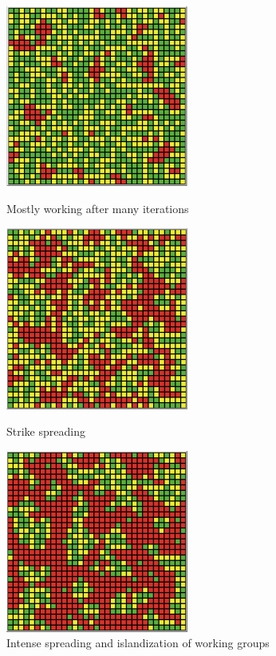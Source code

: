 \documentclass[11pt]{article}
\begin{document}
\begin{figure}[htbp]
	\centering
	\includegraphics[width=6cm, height=6cm]{start}
	\caption{Mostly working after many iterations}
	\centering
	\includegraphics[width=6cm, height=6cm]{middle}
	\caption{Strike spreading}
	\centering
	\includegraphics[width=6cm, height=6cm]{end}
	\caption{Intense spreading and islandization of working groups}
\end{figure}
\end{document}
